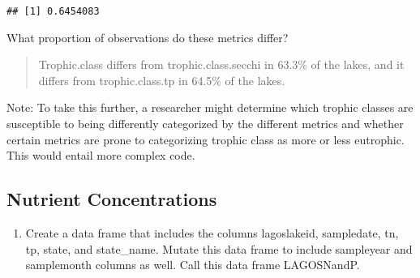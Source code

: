 \documentclass[]{article}
\providecommand{\tightlist}{%
  \setlength{\itemsep}{0pt}\setlength{\parskip}{0pt}}
\begin{document}
\begin{verbatim}
## [1] 0.6454083
\end{verbatim}

What proportion of observations do these metrics differ?

\begin{quote}
Trophic.class differs from trophic.class.secchi in 63.3\% of the lakes,
and it differs from trophic.class.tp in 64.5\% of the lakes.
\end{quote}

Note: To take this further, a researcher might determine which trophic
classes are susceptible to being differently categorized by the
different metrics and whether certain metrics are prone to categorizing
trophic class as more or less eutrophic. This would entail more complex
code.

\hypertarget{nutrient-concentrations}{%
\subsection{Nutrient Concentrations}\label{nutrient-concentrations}}

\begin{enumerate}
\def\labelenumi{\arabic{enumi}.}
\setcounter{enumi}{7}
\tightlist
\item
  Create a data frame that includes the columns lagoslakeid, sampledate,
  tn, tp, state, and state\_name. Mutate this data frame to include
  sampleyear and samplemonth columns as well. Call this data frame
  LAGOSNandP.
\end{enumerate}
\end{document}
